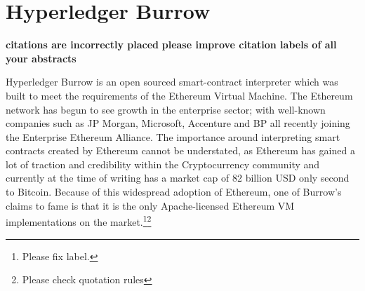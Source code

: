 \section{Hyperledger Burrow}

{\bf citations are incorrectly placed}
{\bf please improve citation labels of all your abstracts}

Hyperledger Burrow is an open sourced smart-contract interpreter which
was built to meet the requirements of the Ethereum Virtual
Machine. The Ethereum network has begun to see growth in the
enterprise sector; with well-known companies such as JP Morgan,
Microsoft, Accenture and BP all recently joining the Enterprise
Ethereum Alliance.\cite{Behlendorf} The importance around interpreting
smart contracts created by Ethereum cannot be understated, as Ethereum
has gained a lot of traction and credibility within the Cryptocurrency
community and currently at the time of writing has a market cap of 82
billion USD only second to Bitcoin. Because of this widespread
adoption of Ethereum, one of Burrow’s claims to fame is that it is the
only Apache-licensed Ethereum VM implementations on the
market.\cite{Hyperledger Burrow}\footnote{Please fix label.}\footnote{Please check quotation rules}


